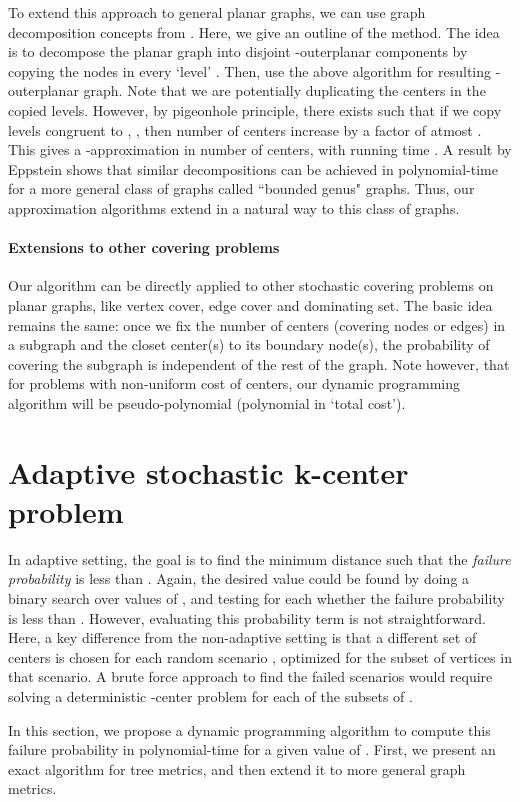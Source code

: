 \documentclass[11pt,onecolumn]{article}
\begin{document}
To extend this approach to general planar graphs, we can use graph decomposition concepts from \cite{baker94}. Here, we give an outline of the method. 
The idea is to decompose the planar graph into disjoint -outerplanar components by copying the nodes in every  `level' \cite{baker94}. Then, use the above algorithm for resulting -outerplanar graph. Note that we are potentially duplicating the centers in the copied levels. However, by pigeonhole principle, there exists  such that if we copy levels congruent to , , then number of centers increase by a factor of atmost . This gives a -approximation in number of centers, with running time .
A result by Eppstein \cite{eppstein} shows that similar decompositions can be achieved in polynomial-time for a more general class of graphs called ``bounded genus" graphs. Thus, our approximation algorithms extend in a natural way to this class of graphs. 

\paragraph{Extensions to other covering problems}
Our algorithm can be directly applied to other stochastic covering problems on planar graphs, like vertex cover, edge cover and dominating set. The basic idea remains the same: once we fix the number of centers (covering nodes or edges) in a subgraph and the closet center(s) to its boundary node(s), the probability of covering the subgraph is independent of the rest of the graph. Note however, that for problems with non-uniform cost of centers, our dynamic programming algorithm will be pseudo-polynomial (polynomial in `total cost').
\section{Adaptive stochastic k-center problem}
In adaptive setting, the goal is to find the minimum distance  such that the {\it failure probability}  is less than . Again, the desired value  could be found by doing a binary search over  values of , and testing for each  whether the failure probability is less than . 
However, evaluating this probability term is not straightforward. Here, a key difference from the non-adaptive setting is that a different set of centers  is chosen for each random scenario , optimized for the subset of vertices in that scenario. A brute force approach to find the failed scenarios would require solving a deterministic -center problem for each of the  subsets of .


In this section, we propose a dynamic programming algorithm to compute this failure probability in polynomial-time for a given value of . 
First, we present an exact algorithm for tree metrics, and then extend it to more general graph metrics.
\end{document}
